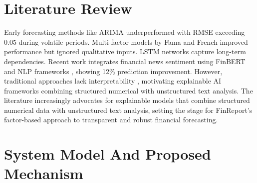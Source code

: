 \documentclass[3p,times,procedia]{elsarticle}
\begin{document}


\section{Literature Review}

Early forecasting methods like ARIMA \cite{Box1970} underperformed with RMSE exceeding 0.05 during volatile periods. Multi-factor models by Fama and French \cite{FAMA1993} improved performance but ignored qualitative inputs. LSTM networks \cite{Fischer2018} capture long-term dependencies. Recent work integrates financial news sentiment using FinBERT \cite{Araci2019} and NLP frameworks \cite{Loughran2011}, showing 12\% prediction improvement. However, traditional approaches lack interpretability \cite{Ribeiro2016}, motivating explainable AI frameworks combining structured numerical with unstructured text analysis.  The literature increasingly advocates for explainable models that combine structured numerical data with unstructured text analysis, setting the stage for FinReport’s factor-based approach to transparent and robust financial forecasting.

\section{System Model And Proposed Mechanism}
\end{document}
